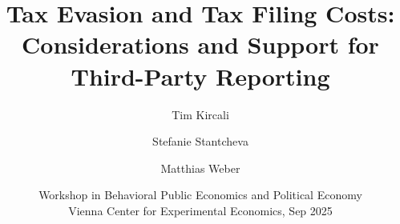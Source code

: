 \documentclass{beamer}
\title[Tax Evasion and Tax Filing Costs]{Tax Evasion and Tax Filing Costs: \\Considerations and Support for Third-Party Reporting} %
\author[Kircali, Stantcheva and Weber] %
{Tim Kircali\inst{1} \and Stefanie Stantcheva\inst{2} \and Matthias Weber\inst{1}}
\institute[] %
{
\inst{1} University of St.Gallen \\
\inst{2} Harvard University
}
{
\medskip

}
\date[Vienna, Sep 2025]{Workshop in Behavioral Public Economics and Political Economy\\ Vienna Center for Experimental Economics, Sep 2025}
\begin{document}
\begin{frame}
\titlepage %
\end{frame}




\end{document}
